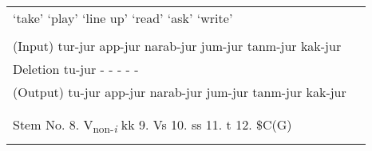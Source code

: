 \begin{table}
\begin{tabular}{ll}
  ‘take’  ‘play’  ‘line up’  ‘read’  ‘ask’  ‘write’                                                                                                                                                                                                           \\
                                                                                                                                                                                                                                                              \\
(Input)  tur-jur  app-jur  narab-jur  jum-jur  tanm-jur  kak-jur                                                                                                                                                                                              \\
Deletion  tu-jur  -  -  -  -  -                                                                                                                                                                                                                               \\
(Output)  tu-jur  app-jur  narab-jur  jum-jur  tanm-jur  kak-jur                                                                                                                                                                                              \\
                                                                                                                                                                                                                                                              \\
\tablevspace                                                                                                                                                                                                                                                  \\
Stem No.  8. V\textsubscript{non-}\textit{\textsubscript{i}} kk  9. Vs  10. ss  11. t  12. \$C(G)                                                                                                                                                             \\
                                                                                                                                                                                                                                                              \\

\end{tabular}
\end{table}
